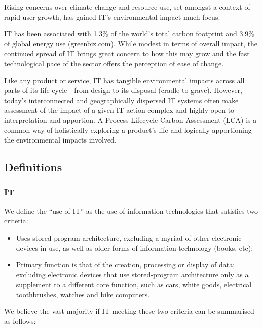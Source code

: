\documentclass[conference]{IEEEtran}
\begin{document}
Rising concerns over climate change and resource use, set amongst a
context of rapid user growth, has gained IT’s environmental impact
much focus.

IT has been associated with 1.3\% of the world’s total carbon
footprint and 3.9\% of global energy use (greenbiz.com). While modest
in terms of overall impact, the continued spread of IT brings great
concern to how this may grow and the fast technological pace of the
sector offers the perception of ease of change.

Like any product or service, IT has tangible environmental impacts
across all parts of its life cycle - from design to its disposal
(cradle to grave). However, today’s interconnected and geographically
dispersed IT systems often make assessment of the impact of a given IT
action complex and highly open to interpretation and apportion. A
Process Lifecycle Carbon Assessment (LCA) is a common way of
holistically exploring a product’s life and logically apportioning the
environmental impacts involved.

\subsection{Definitions}

\subsubsection{IT}

We define the ``use of IT'' as the use of information technologies
that satisfies two criteria:

\begin{itemize}
\item Uses stored-program architecture, excluding a myriad of other
  electronic devices in use, as well as older forms of information
  technology (books, etc);
\item Primary function is that of the creation, processing or display
  of data; excluding electronic devices that use stored-program
  architecture only as a supplement to a different core function, such
  as cars, white goods, electrical toothbrushes, watches and bike
  computers.
\end{itemize}

We believe the vast majority if IT meeting these two criteria can be
summarised as follows:
\end{document}
